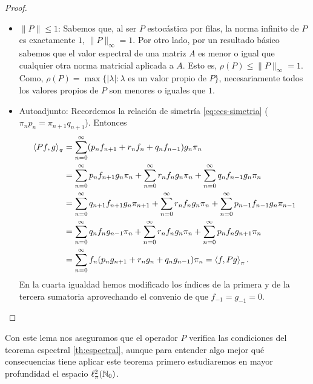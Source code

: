 \begin{proof}
\begin{itemize}
            \item $\|P\|\leq 1$: Sabemos que, al ser $P$ estocástica por filas, la norma infinito de $P$ es exactamente $1$, $\|P\|_\infty=1$. Por otro lado, por un resultado básico sabemos que el valor espectral de una matriz $A$ es menor o igual que cualquier otra norma matricial aplicada a $A$. Esto es, $\rho(P)\leq\|P\|_\infty = 1$. Como, $\rho(P)=\max\{|\lambda|:\lambda\text{ es un valor propio de }P\}$, necesariamente todos los valores propios de $P$ son menores o iguales que $1$. 
            \item Autoadjunto: Recordemos la relación de simetría \eqref{eq:ecs-simetria} ($\pi_n p_n = \pi_{n+1}q_{n+1}$). Entonces
            \begin{equation*}
                \begin{split}
                    \left\langle Pf , g \right\rangle_\pi&=\sum_{n=0}^\infty(p_n f_{n+1} + r_n f_n + q_n f_{n-1})g_n\pi_n\\
                    &= \sum_{n=0}^\infty p_n f_{n+1}g_n\pi_n + \sum_{n=0}^\infty r_n f_{n}g_n\pi_n + \sum_{n=0}^\infty q_n f_{n-1}g_n\pi_n \\
                    &= \sum_{n=0}^\infty q_{n+1} f_{n+1}g_n\pi_{n+1} + \sum_{n=0}^\infty r_n f_{n}g_n\pi_n + \sum_{n=0}^\infty p_{n-1} f_{n-1}g_n\pi_{n-1} \\
                    &= \sum_{n=0}^\infty q_{n} f_{n}g_{n-1}\pi_{n} + \sum_{n=0}^\infty r_n f_{n}g_n\pi_n + \sum_{n=0}^\infty p_{n} f_{n}g_{n+1}\pi_{n} \\
                    &= \sum_{n=0}^\infty f_n(p_n g_{n+1} + r_n g_n+ q_n g_{n-1})\pi_n = \left\langle f , Pg \right\rangle_\pi.
                \end{split}  
            \end{equation*}
            En la cuarta igualdad hemos modificado los índices de la primera y de la tercera sumatoria aprovechando el convenio de que $f_{-1}=g_{-1}=0$.

        \end{itemize}

    \end{proof}

    Con este lema nos aseguramos que el operador $P$ verifica las condiciones del teorema espectral \ref{th:espectral}, aunque para entender algo mejor qué consecuencias tiene aplicar este teorema primero estudiaremos en mayor profundidad el espacio $\ell^2_\pi(\mathbb{N}_0)$.

